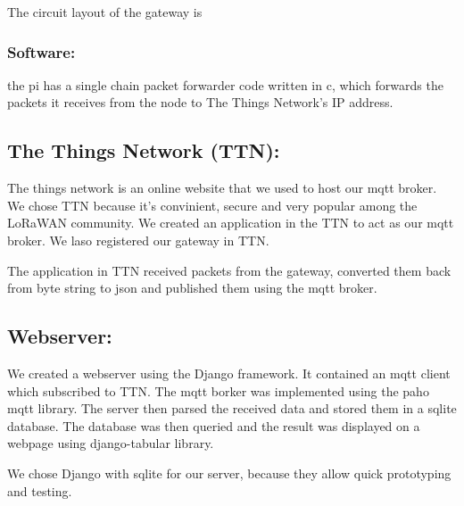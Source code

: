 The circuit layout of the gateway is





\subsubsection{Software:}
the pi has a single chain packet forwarder code written in c, which forwards the packets it receives from the node to The Things Network's IP address. 


\subsection{The Things Network (TTN):}
The things network is an online website that we used to host our mqtt broker. We chose TTN because it's convinient, secure and very popular among the LoRaWAN community. We created an application in the TTN to act as our mqtt broker. We laso registered our gateway in TTN.

The application in TTN received packets from the gateway, converted them back from byte string to json and published them using the mqtt broker.


\subsection{Webserver:}
We created a webserver using the Django framework. It contained an mqtt client which subscribed to TTN. The mqtt borker was implemented using the paho mqtt library. The server then parsed the received data and stored them in a sqlite database. The database was then queried and the result was displayed on a webpage using django-tabular library.

We chose Django with sqlite for our server, because they allow quick prototyping and testing.

